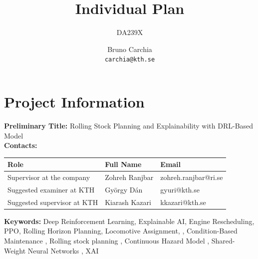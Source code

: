 \documentclass[a4paper]{scrartcl}
\title{Individual Plan}
\subtitle{DA239X}
\author{
Bruno Carchia \\
\texttt{carchia@kth.se}
}
\begin{document}
\maketitle

\section{Project Information}
\noindent \textbf{Preliminary Title: }Rolling Stock Planning and Explainability with DRL-Based Model \\
\noindent \textbf{Contacts:}

\vspace{-2em} %

\begin{center}
    \small %
    \begin{tabular}{|p{5.5cm}|p{3.5cm}|p{4.5cm}|}
    \hline
    \textbf{Role} & \textbf{Full Name} & \textbf{Email} \\
    \hline
    Supervisor at the company &  Zohreh Ranjbar &  zohreh.ranjbar@ri.se \\
    \hline
    Suggested examiner at KTH & György Dán  & gyuri@kth.se  \\
    \hline
    Suggested supervisor at KTH & Kiarash Kazari &  kkazari@kth.se \\
    \hline
    \end{tabular}
\end{center}


\noindent \textbf{Keywords:} Deep Reinforcement Learning, Explainable AI, Engine Rescheduling, PPO, Rolling Horizon Planning, Locomotive Assignment, , Condition-Based Maintenance , Rolling stock planning , Continuous Hazard Model , Shared-Weight Neural Networks , XAI
\end{document}
